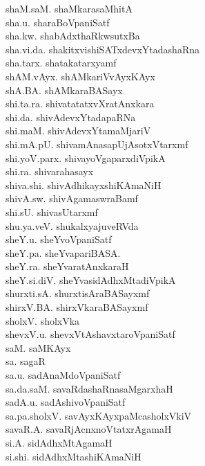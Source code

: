 {\begin{multicols}{2}
\begin{tabbing}
shaM.saM. \> shaMkarasaMhitA\\[2pt]
sha.u. \> sharaBoVpaniSatf\\[2pt]
sha.kw. \> shabAdxthaRkwsutxBa\\[2pt]
sha.vi.da. \> shakitxvishiSATxdevxYtadashaRna\\[2pt]
sha.tarx. \> shatakatarxyamf\\[2pt]
shAM.vAyx. \> shAMkariVvAyxKAyx\\[2pt]
shA.BA. \> shAMkaraBASayx\\[2pt]
shi.ta.ra. \> shivatatatxvXratAnxkara\\[2pt]
shi.da. \> shivAdevxYtadapaRNa\\[2pt]
shi.maM. \> shivAdevxYtamaMjariV\\[2pt]
shi.mA.pU. \> shivamAnasapUjAsotxVtarxmf\\[2pt]
shi.yoV.parx. \> shivayoVgaparxdiVpikA\\[2pt]
shi.ra. \> shivarahasayx\\[2pt]
shiva.shi. \> shivAdhikayxshiKAmaNiH\\[2pt]
shivA.sw. \> shivAgamaswraBamf\\[2pt]
shi.sU. \> shivasUtarxmf\\[2pt]
shu.ya.veV. \> shukalxyajuveRVda\\[2pt]
sheY.u. \> sheYvoVpaniSatf\\[2pt]
sheY.pa. \> sheYvapariBASA.\\[2pt]
sheY.ra. \> sheYvaratAnxkaraH\\[2pt]
sheY.si.diV. \> sheYvasidAdhxMtadiVpikA\\[2pt]
shurxti.sA. \> shurxtisAraBASayxmf\\[2pt]
shirxV.BA. \> shirxVkaraBASayxmf\\[2pt]
sholxV. \> sholxVka\\[2pt]
shevxV.u. \> shevxVtAshavxtaroVpaniSatf\\[2pt]
saM. \> saMKAyx\\[2pt]
sa. \> sagaR\\[2pt]
sa.u. \> sadAnaMdoVpaniSatf\\[2pt]
sa.da.saM. \> savaRdashaRnasaMgarxhaH\\[2pt]
sadA.u. \> sadAshivoVpaniSatf\\[2pt]
sa.pa.sholxV. \> savAyxKAyxpaMcasholxVkiV\\[2pt]
savaR.A. \> savaRjAcnxnoVtatxrAgamaH\\[2pt]
si.A. \> sidAdhxMtAgamaH\\[2pt]
si.shi. \> sidAdhxMtashiKAmaNiH\\[2pt]

\end{tabbing}
\end{multicols}}
